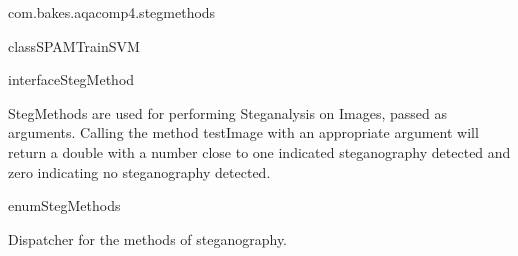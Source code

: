 \begin{texdocpackage}{com.bakes.aqacomp4.stegmethods}
\begin{texdocclass}{class}{SPAMTrainSVM}
\label{texdoclet:com.bakes.aqacomp4.stegmethods.SPAMTrainSVM}
\begin{texdocclassintro}
\end{texdocclassintro}
\begin{texdocclassconstructors}
\end{texdocclassconstructors}
\begin{texdocclassmethods}
\end{texdocclassmethods}
\end{texdocclass}


\begin{texdocclass}{interface}{StegMethod}
\label{texdoclet:com.bakes.aqacomp4.stegmethods.StegMethod}
\begin{texdocclassintro}
StegMethods are used for performing Steganalysis on Images, passed as arguments.
 Calling the method testImage with an appropriate argument will return a double
 with a number close to one indicated steganography detected and zero indicating no steganography detected.\end{texdocclassintro}
\begin{texdocclassmethods}
\end{texdocclassmethods}
\end{texdocclass}


\begin{texdocclass}{enum}{StegMethods}
\label{texdoclet:com.bakes.aqacomp4.stegmethods.StegMethods}
\begin{texdocclassintro}
Dispatcher for the methods of steganography.
 

\end{texdocclassintro}
\end{texdocclass}
\end{texdocpackage}
